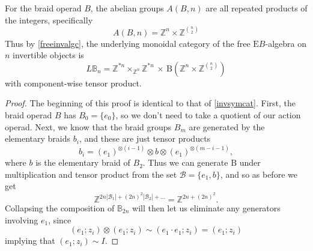 \documentclass{amsbook} %
\numberwithin{section}{chapter}
\begin{document}
\begin{prop} \label{invbraidcat} For the braid operad $B$, the abelian groups $A(B,n)$ are all repeated products of the integers, specifically
  \[
    A(B,n) = \mathbb{Z}^{n} \times \mathbb{Z}^{\binom{n}{2}} \]
Thus by \cref{freeinvalgc}, the underlying monoidal category of the free $\mathrm{E}B$-algebra on $n$ invertible objects is
  \[
    L\mathbb{B}_n = \mathbb{Z}^{\ast n} \times_{\mathbb{Z}^n} \mathbb{Z}^{\ast n}  \, \times \, \mathrm{B}(\mathbb{Z}^{n} \times \mathbb{Z}^{\binom{n}{2}} )
  \]
with component-wise tensor product.
\end{prop}
\begin{proof}
The beginning of this proof is identical to that of \cref{invsymcat}. First, the braid operad $B$ has $B_0 = \{e_0\}$, so we don't need to take a quotient of our action operad. Next, we know that the braid groups $B_m$ are generated by the elementary braids $b_i$, and these are just tensor products
  \[
    b_i = (e_1)^{\otimes (i-1)} \otimes b \otimes (e_1)^{\otimes (m-i-1)},
  \]
where $b$ is the elementary braid of $B_2$. Thus we can generate $\mathrm{B}$ under multiplication and tensor product from the set $\mathcal{B} = \{ e_1, b \}$, and so as before we get
  \[
    \mathbb{Z}^{2n|\mathcal{B}_1| + (2n)^2|\mathcal{B}_2| + \ldots}  = \mathbb{Z}^{2n + (2n)^2}.
  \]
Collapsing the composition of $\mathbb{B}_{2n}$ will then let us eliminate any generators involving $e_1$, since
  \[
    (e_1; z_i) \otimes (e_1; z_i) \sim (e_1 \cdot e_1; z_i) = (e_1; z_i)
  \]
implying that $(e_1; z_i) \sim I$.


\end{proof}
\end{document}
